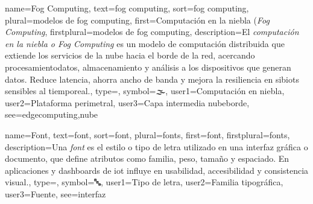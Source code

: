 	{
		name={Fog Computing},
		text={fog computing},
		sort={fog computing},
		plural={modelos de fog computing},
		first={Computaci{\'o}n en la niebla (\textit{Fog Computing}},
		firstplural={modelos de fog computing},
		description={El \emph{computaci{\'o}n en la niebla o \textit{Fog Computing}} es un modelo de computaci{\'o}n distribuida que extiende los servicios de la \gls{nube} hacia el borde de la \gls{red}, acercando \gls{procesamientodatos}, \gls{almacenamiento} y an{\'a}lisis a los \glspl{dispositivo} que generan \glspl{dato}. Reduce \gls{latencia}, ahorra ancho de banda y mejora la resiliencia en \glspl{sibiot} sensibles al \gls{tiemporeal}.},
		type=\glsdefaulttype,
		symbol={🌫️},
		user1={Computaci{\'o}n en niebla},
		user2={Plataforma perimetral},
		user3={Capa intermedia nube\textendash borde},
		see={edgecomputing,nube}
	}
	
	{
		name={Font},
		text={font},
		sort={font},
		plural={fonts},
		first={font},
		firstplural={fonts},
		description={Una \emph{font} es el estilo o tipo de letra utilizado en una \gls{interfaz} gr{\'a}fica o documento, que define atributos como familia, peso, tama{\~n}o y espaciado. En aplicaciones y \glspl{dashboard} de \gls{iot} influye en usabilidad, accesibilidad y consistencia visual.},
		type=\glsdefaulttype,
		symbol={🔤},
		user1={Tipo de letra},
		user2={Familia tipogr{\'a}fica},
		user3={Fuente},
		see={interfaz}
	}
	
	
